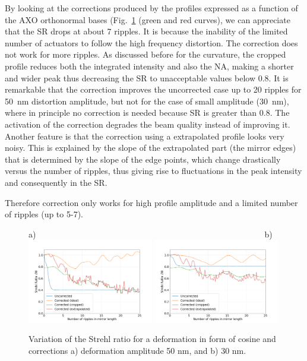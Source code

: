 \documentclass[preprint]{iucr}
\begin{document}
By looking at the corrections produced by the profiles expressed as a function of the AXO orthonormal bases (Fig.~\ref{fig:strehlRatioCosine} (green and red curves), we can appreciate that the SR drops at about 7 ripples. It is because the inability of the limited number of actuators to follow the high frequency distortion. The correction does not work for more ripples. As discussed before for the curvature, the cropped profile reduces both the integrated intensity and also the NA, making a shorter and wider peak thus decreasing the SR to unacceptable values below 0.8. It is remarkable that the correction improves the uncorrected case up to 20 ripples for 50~nm distortion amplitude, but not for the case of small amplitude (30~nm), where in principle no correction is needed because SR is greater than 0.8. The activation of the correction degrades the beam quality instead of improving it. 
Another feature is that the correction using a extrapolated profile looks very noisy. This is explained by the slope of the extrapolated part (the mirror edges) that is determined by the slope of the edge points, which change drastically versus the number of ripples, thus giving rise to fluctuations in the peak intensity and consequently in the SR.


Therefore correction only works for high profile amplitude and a limited number of ripples (up to 5-7).
 
  \begin{figure}
  \label{fig:strehlRatioCosine} 
  \begin{flushleft}
  a)~~~~~~~~~~~~~~~~~~~~~~~~~~~~~~~~~~~~~~~~~~~~~~~~~~~~~~~b)\\
  \includegraphics[width=0.49\textwidth]{figures/scan_peak_vs_cos50.png}
  \includegraphics[width=0.49\textwidth]{figures/scan_peak_vs_cos30.png}
  \end{flushleft}
  \caption{Variation of the Strehl ratio for a deformation in form of cosine and corrections a) deformation amplitude 50 nm, and b) 30 nm.}
  \end{figure} 
\end{document}
